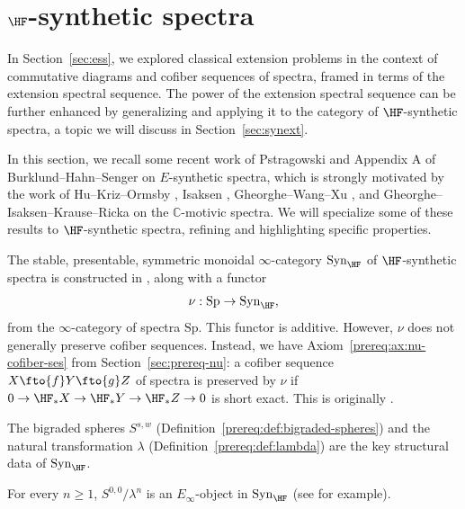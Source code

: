 \section{$\HF$-synthetic spectra} \label{sec:synthetic}

In Section~\ref{sec:ess}, we explored classical extension problems in the context of commutative diagrams and cofiber sequences of spectra, framed in terms of the extension spectral sequence. The power of the extension spectral sequence can be further enhanced by generalizing and applying it to the category of $\HF$-synthetic spectra, a topic we will discuss in Section~\ref{sec:synext}.

In this section, we recall some recent work of Pstragowski \cite{Pst} and Appendix A of Burklund--Hahn--Senger \cite{BHS} on $E$-synthetic spectra, which is strongly motivated by the work of Hu--Kriz--Ormsby \cite{HuKrizOrmsby}, Isaksen \cite{Isaksen}, Gheorghe--Wang--Xu \cite{GWX}, and Gheorghe--Isaksen--Krause--Ricka \cite{GIKR} on the $\mathbb{C}$-motivic spectra. We will specialize some of these results to $\HF$-synthetic spectra, refining and highlighting specific properties.

The stable, presentable, symmetric monoidal $\infty$-category $\mathrm{Syn}_{\HF}$ of $\HF$-synthetic spectra is constructed in \cite{Pst}, along with a functor
$$\nu: \mathrm{Sp}\to \mathrm{Syn}_{\HF},$$
from the $\infty$-category of spectra $\mathrm{Sp}$. This functor is additive. However, $\nu$ does not generally preserve cofiber sequences. Instead, we have Axiom~\ref{prereq:ax:nu-cofiber-ses} from Section~\ref{sec:prereq-nu}: a cofiber sequence $X\fto{f} Y\fto{g} Z$ of spectra is preserved by $\nu$ if $0\to {\HF}_*X\to {\HF}_*Y\to {\HF}_*Z\to 0$ is short exact. This is originally \cite[Lemma 4.23]{Pst}.

The bigraded spheres $S^{s,w}$ (Definition~\ref{prereq:def:bigraded-spheres}) and the natural transformation $\lambda$ (Definition~\ref{prereq:def:lambda}) are the key structural data of $\mathrm{Syn}_{\HF}$.

\begin{remark}
For every $n\ge 1$, $S^{0,0}/\lambda^n$ is an $E_\infty$-object in $\mathrm{Syn}_{\HF}$ (see \cite[Appendix B, C]{BHSmot} for example).
\end{remark}


